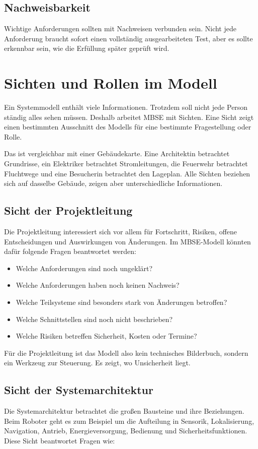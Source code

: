 \subsection{Nachweisbarkeit}
Wichtige Anforderungen sollten mit Nachweisen verbunden sein. Nicht jede Anforderung braucht sofort einen vollständig ausgearbeiteten Test, aber es sollte erkennbar sein, wie die Erfüllung später geprüft wird.

\section{Sichten und Rollen im Modell}
Ein Systemmodell enthält viele Informationen. Trotzdem soll nicht jede Person ständig alles sehen müssen. Deshalb arbeitet MBSE mit Sichten. Eine Sicht zeigt einen bestimmten Ausschnitt des Modells für eine bestimmte Fragestellung oder Rolle.

Das ist vergleichbar mit einer Gebäudekarte. Eine Architektin betrachtet Grundrisse, ein Elektriker betrachtet Stromleitungen, die Feuerwehr betrachtet Fluchtwege und eine Besucherin betrachtet den Lageplan. Alle Sichten beziehen sich auf dasselbe Gebäude, zeigen aber unterschiedliche Informationen.

\subsection{Sicht der Projektleitung}
Die Projektleitung interessiert sich vor allem für Fortschritt, Risiken, offene Entscheidungen und Auswirkungen von Änderungen. Im MBSE-Modell könnten dafür folgende Fragen beantwortet werden:

\begin{itemize}
    \item Welche Anforderungen sind noch ungeklärt?
    \item Welche Anforderungen haben noch keinen Nachweis?
    \item Welche Teilsysteme sind besonders stark von Änderungen betroffen?
    \item Welche Schnittstellen sind noch nicht beschrieben?
    \item Welche Risiken betreffen Sicherheit, Kosten oder Termine?
\end{itemize}

Für die Projektleitung ist das Modell also kein technisches Bilderbuch, sondern ein Werkzeug zur Steuerung. Es zeigt, wo Unsicherheit liegt.

\subsection{Sicht der Systemarchitektur}
Die Systemarchitektur betrachtet die großen Bausteine und ihre Beziehungen. Beim Roboter geht es zum Beispiel um die Aufteilung in Sensorik, Lokalisierung, Navigation, Antrieb, Energieversorgung, Bedienung und Sicherheitsfunktionen. Diese Sicht beantwortet Fragen wie:

